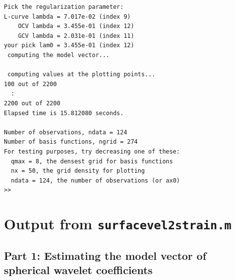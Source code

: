 \documentclass[11pt,titlepage,fleqn]{article}
\begin{document}
\begin{spacing}{1.0}
\begin{verbatim}
Pick the regularization parameter:
L-curve lambda = 7.017e-02 (index 9)
    OCV lambda = 3.455e-01 (index 12)
    GCV lambda = 2.031e-01 (index 11)
your pick lam0 = 3.455e-01 (index 12)
 computing the model vector...
  
 computing values at the plotting points...
100 out of 2200
  :
2200 out of 2200
Elapsed time is 15.812080 seconds.
  
Number of observations, ndata = 124
Number of basis functions, ngrid = 274
For testing purposes, try decreasing one of these:
  qmax = 8, the densest grid for basis functions
  nx = 50, the grid density for plotting
  ndata = 124, the number of observations (or ax0)
>> 
\end{verbatim}
\end{spacing}


\section{Output from {\tt surfacevel2strain.m}}
\label{sec:surfacevel2strain_out}

\subsection*{Part 1: Estimating the model vector of spherical wavelet coefficients}
\end{document}
